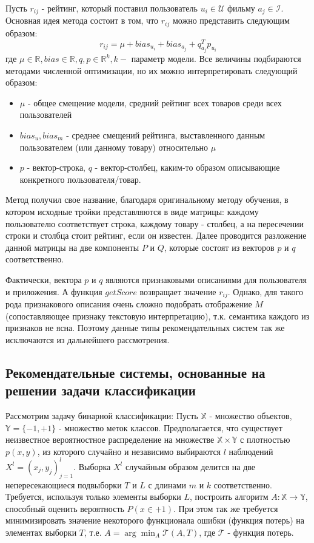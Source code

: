 \documentclass[12pt,a4paper]{report}
\begin{document}
Пусть $r_{ij}$ - рейтинг, который поставил пользователь $u_i \in \mathcal{U}$ фильму $a_j \in \mathcal{I}$. Основная идея метода состоит в том, что $r_{ij}$ можно представить следующим образом:
\begin{equation*}
r_{ij} = \mu + bias_{u_i} + bias_{a_j} + q_{a_j}^Tp_{u_i}
\end{equation*}
где $\mu \in \mathbb{R}, bias \in \mathbb{R}, q,p \in \mathbb{R}^k, k - $ параметр модели.
Все величины подбираются методами численной оптимизации, но их можно интерпретировать следующий образом:
\begin{itemize}
\item $\mu$ - общее смещение модели, средний рейтинг всех товаров среди всех пользователей
\item $bias_u, bias_m$ - среднее смещений рейтинга, выставленного данным пользователем (или данному товару) относительно $\mu$
\item $p$ - вектор-строка, $q$ - вектор-столбец, каким-то образом описывающие конкретного пользователя/товар.
\end{itemize}

Метод получил свое название, благодаря оригинальному методу обучения, в котором  исходные тройки представляются в виде матрицы: каждому пользователю соответствует строка, каждому товару - столбец, а на пересечении строки и столбца стоит рейтинг, если он известен. Далее проводится разложение данной матрицы на две компоненты $P$ и $Q$, которые состоят из векторов $p$ и $q$ соответственно.

Фактически, вектора $p$ и $q$ являются признаковыми описаниями для пользователя и приложения. А функция $getScore$ возвращает значение $r_{ij}$. Однако, для такого рода признакового описания очень сложно подобрать отображение $M$ (сопоставляющее признаку текстовую интерпретацию), т.к. семантика каждого из признаков не ясна. Поэтому данные типы рекомендательных систем так же исключаются из дальнейшего рассмотрения.
\subsection{Рекомендательные системы, основанные на решении задачи классификации}

Рассмотрим задачу бинарной классификации:
Пусть $\mathbb{X}$ - множество объектов, $\mathbb{Y} = \{-1, +1\}$ - множество меток классов. Предполагается, что существует неизвестное вероятностное распределение на множестве $\mathbb{X} \times \mathbb{Y}$ с плотностью $p(x, y)$, из которого случайно и независимо выбираются $l$ наблюдений $X^l = (x_j, y_j)_{j=1}^l	$. Выборка $X^l$ случайным образом делится на две непересекающиеся подвыборки $T$ и $L$ с длинами $m$ и $k$ соответственно. Требуется, используя только элементы выборки $L$, построить алгоритм $A:\mathbb{X} \to \mathbb{Y}$, способный оценить вероятность $P(x \in +1)$. При этом так же требуется минимизировать значение некоторого функционала ошибки (функция потерь) на элементах выборки $T$, т.е. $A = \arg \min_{A}\mathcal{T}(A, T)$, где $\mathcal{T}$ - функция потерь.
\end{document}
